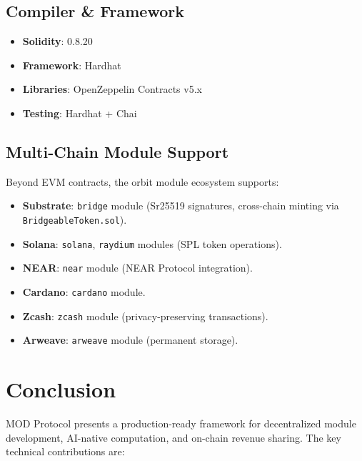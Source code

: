 \documentclass[11pt,a4paper]{article}
\begin{document}
\subsection{Compiler \& Framework}

\begin{itemize}
    \item \textbf{Solidity}: 0.8.20
    \item \textbf{Framework}: Hardhat
    \item \textbf{Libraries}: OpenZeppelin Contracts v5.x
    \item \textbf{Testing}: Hardhat + Chai
\end{itemize}

\subsection{Multi-Chain Module Support}

Beyond EVM contracts, the orbit module ecosystem supports:
\begin{itemize}
    \item \textbf{Substrate}: \texttt{bridge} module (Sr25519 signatures, cross-chain minting via \texttt{BridgeableToken.sol}).
    \item \textbf{Solana}: \texttt{solana}, \texttt{raydium} modules (SPL token operations).
    \item \textbf{NEAR}: \texttt{near} module (NEAR Protocol integration).
    \item \textbf{Cardano}: \texttt{cardano} module.
    \item \textbf{Zcash}: \texttt{zcash} module (privacy-preserving transactions).
    \item \textbf{Arweave}: \texttt{arweave} module (permanent storage).
\end{itemize}

\section{Conclusion}
\label{sec:conclusion}

MOD Protocol presents a production-ready framework for decentralized module development, AI-native computation, and on-chain revenue sharing. The key technical contributions are:
\end{document}
